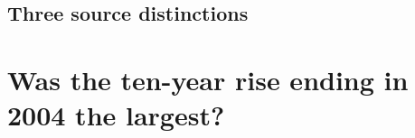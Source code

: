 \subsection{Three source distinctions}
                                                                                                                                                                                                                                                                                                                                                                                                                  
                                                                                                                                                                                                                                                                                                                                              
                                                                                                                                                                                                                                                                                                                                                                                                                                                                     
\section{Was the ten-year rise ending in 2004 the largest?}\label{sec:decade}
                                                                                                                                                                                                                                                                                        

\begin{table}[H]\centering\small
\caption{                                                                                          }\label{tab:decade}

\end{table}
                                                                                                                                                                                                                                                                                                                                                                                                                                                                
